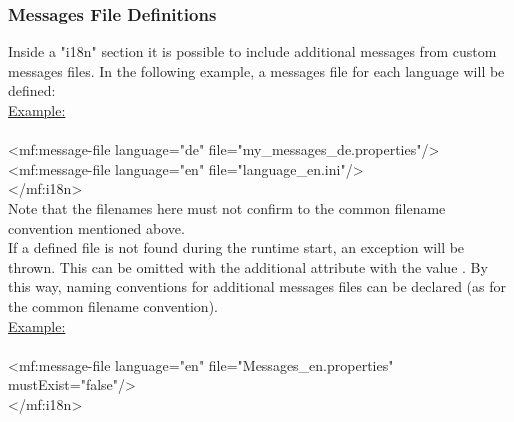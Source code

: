   \subsubsection{Messages File Definitions}
  Inside a "i18n" section it is possible to include additional messages from custom messages files.
  In the following example, a messages file for each language will be defined:\\
  \underline{Example:}\\
  {\small\ttfamily
    \\
    \indent\indent <mf:message-file language="de" file="my\_messages\_de.properties"/>\\
    \indent\indent <mf:message-file language="en" file="language\_en.ini"/>\\
    \indent </mf:i18n>\\
  }
  Note that the filenames here must not confirm to the common filename convention mentioned above.\\
  If a defined file is not found during the runtime start, an exception will be thrown. This can be
  omitted with the additional attribute  with the value .
  By this way, naming conventions for additional messages files can be declared (as for the common
  filename convention).\\
  \underline{Example:}\\
  {\small\ttfamily
    \\
    \indent\indent <mf:message-file language="en" file="Messages\_en.properties"\\
    \indent\indent\indent mustExist="false"/>\\
    \indent </mf:i18n>\\
  }
  

